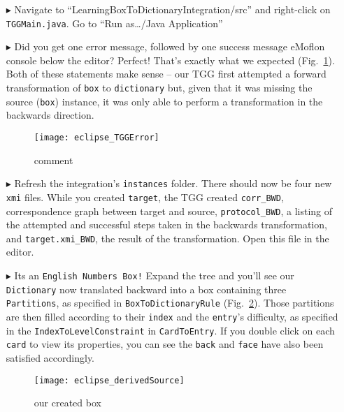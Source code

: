 \begin{itemize}
\item[$\blacktriangleright$] Navigate to ``LearningBox\-To\-Dictionary\-In\-te\-gra\-tion\-/src'' and right-click on \texttt{TGGMain.java}. Go to ``Run
as\ldots/Java Application''

\item[$\blacktriangleright$] Did you get one error message, followed by one success message eMoflon console below the editor? Perfect! That's exactly what we
expected (Fig.~\ref{fig:tggERROR}). Both of these statements make sense -- our TGG first attempted a forward transformation of \texttt{box} to
\texttt{dictionary} but, given that it was missing the source (\texttt{box}) instance, it was only able to perform a transformation in the backwards direction.

\begin{figure}[htbp]
\begin{center}
  \texttt{[image: eclipse\_TGGError]}
  \caption{comment}
  \label{fig:tggERROR}
\end{center}
\end{figure}

\newpage

\item[$\blacktriangleright$] Refresh the integration's \texttt{instances} folder. There should now be four new \texttt{xmi} files. While you created
\texttt{target}, the TGG created \texttt{corr\_BWD}, correspondence graph between target and source, \texttt{protocol\_BWD}, a listing of the attempted
and successful steps taken in the backwards transformation, and \texttt{target.xmi\_BWD}, the result of the transformation. Open this file in the editor.

\item[$\blacktriangleright$] Its an \texttt{English Numbers Box!} Expand the tree and you'll see our \texttt{Dictionary} now translated backward into
a box containing three \texttt{Par\-ti\-tions}, as specified in \texttt{Box\-To\-Dictionary\-Rule} (Fig.~\ref{fig:derivedBOX}). Those partitions are then filled
according to their \texttt{index} and the \texttt{entry}'s difficulty, as specified in the \texttt{IndexToLevelConstraint} in \texttt{CardToEntry}. If you
double click on each \texttt{card} to view its properties, you can see the \texttt{back} and \texttt{face} have also been satisfied accordingly.

\begin{figure}[htbp]
\begin{center}
  \texttt{[image: eclipse\_derivedSource]}
  \caption{our created box}
  \label{fig:derivedBOX}
\end{center}
\end{figure}


\end{itemize}
